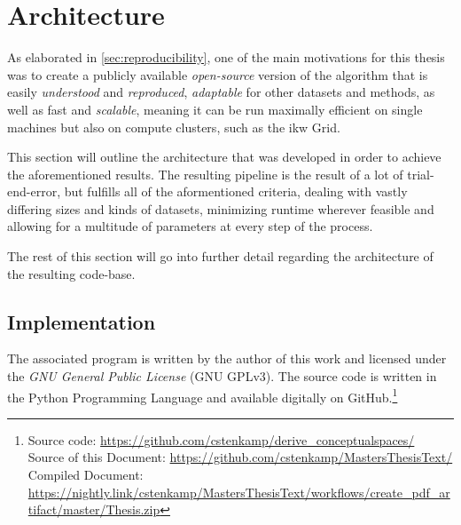 \section{Architecture}
\label{sec:architecture}

As elaborated in \autoref{sec:reproducibility}, one of the main motivations for this thesis was to create a publicly available \textit{open-source} version of the algorithm that is easily \textit{understood} and \textit{reproduced}, \textit{adaptable} for other datasets and methods, as well as fast and \textit{scalable}, meaning it can be run maximally efficient on single machines but also on compute clusters, such as the \acrshort{ikw} Grid.


This section will outline the architecture that was developed in order to achieve the aforementioned results. The resulting pipeline is the result of a lot of trial-end-error, but fulfills all of the aformentioned criteria, dealing with vastly differing sizes and kinds of datasets, minimizing runtime wherever feasible and allowing for a multitude of parameters at every step of the process. %

The rest of this section will go into further detail regarding the architecture of the resulting code-base. %

\subsection{Implementation}

The associated program is written by the author of this work and licensed under the \emph{GNU General Public License} (GNU GPLv3). The source code is written in the Python Programming Language and available digitally on GitHub.\footnote{Source code: \url{https://github.com/cstenkamp/derive_conceptualspaces/}\\Source of this Document: \url{https://github.com/cstenkamp/MastersThesisText/}\\Compiled Document: \url{https://nightly.link/cstenkamp/MastersThesisText/workflows/create_pdf_artifact/master/Thesis.zip}} %

